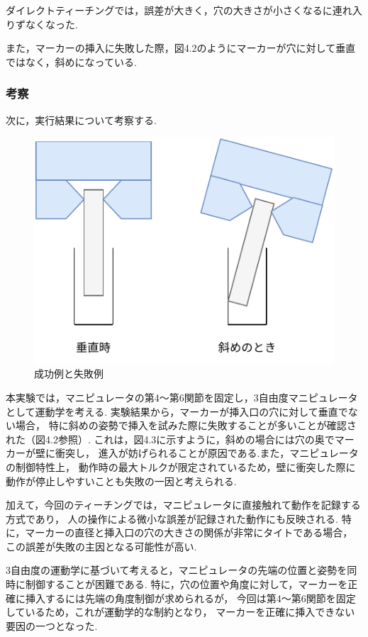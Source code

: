 ダイレクトティーチングでは，誤差が大きく，穴の大きさが小さくなるに連れ入りずなくなった.

また，マーカーの挿入に失敗した際，図4.2のようにマーカーが穴に対して垂直ではなく，斜めになっている.

\newpage

\subsubsection{考察}
次に，実行結果について考察する.

\begin{figure}[h]
  \centering
  \includegraphics[scale=0.8]{sozai/5.pdf}
  \caption{成功例と失敗例}
\end{figure}

本実験では，マニピュレータの第4～第6関節を固定し，3自由度マニピュレータとして運動学を考える.
実験結果から，マーカーが挿入口の穴に対して垂直でない場合，
特に斜めの姿勢で挿入を試みた際に失敗することが多いことが確認された（図4.2参照）.
これは，図4.3に示すように，斜めの場合には穴の奥でマーカーが壁に衝突し，
進入が妨げられることが原因である.また，マニピュレータの制御特性上，
動作時の最大トルクが限定されているため，壁に衝突した際に動作が停止しやすいことも失敗の一因と考えられる.

加えて，今回のティーチングでは，マニピュレータに直接触れて動作を記録する方式であり，
人の操作による微小な誤差が記録された動作にも反映される.
特に，マーカーの直径と挿入口の穴の大きさの関係が非常にタイトである場合，
この誤差が失敗の主因となる可能性が高い.

3自由度の運動学に基づいて考えると，マニピュレータの先端の位置と姿勢を同時に制御することが困難である.
特に，穴の位置や角度に対して，マーカーを正確に挿入するには先端の角度制御が求められるが，
今回は第4～第6関節を固定しているため，これが運動学的な制約となり，
マーカーを正確に挿入できない要因の一つとなった.

